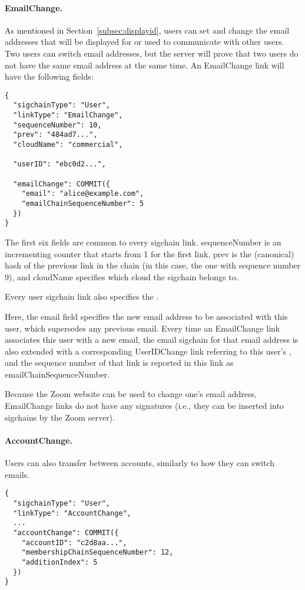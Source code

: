 \paragraph{EmailChange.} As mentioned in Section~\ref{subsec:displayid}, users can set and change the
email addresses that will be displayed for or used to communicate with other users. Two users can switch email addresses,
but the server will prove that two users do not have the same email address at the same time. An
\textsf{EmailChange} link will have the following fields:


\begin{Verbatim}
{
  "sigchainType": "User",
  "linkType": "EmailChange",
  "sequenceNumber": 10,
  "prev": "484ad7...",
  "cloudName": "commercial",

  "userID": "ebc0d2...",

  "emailChange": COMMIT({
    "email": "alice@example.com",
    "emailChainSequenceNumber": 5
  })
}
\end{Verbatim}

The first six fields are common to every sigchain link. \textsf{sequenceNumber} is an incrementing
counter that starts from 1 for the first link, \textsf{prev} is the (canonical) hash of the previous
link in the chain (in this case, the one with sequence number 9), and \textsf{cloudName} specifies
which cloud the sigchain belongs to.

Every user sigchain link also specifies the \userID.

Here, the \textsf{email} field specifies the new email address to be associated with this user,
which supersedes any previous email. Every time an \textsf{EmailChange} link associates this user
with a new email, the email sigchain for that email address is also extended with a corresponding
\textsf{UserIDChange} link referring to this user's \userID, and the sequence number of that link is
reported in this link as \textsf{emailChainSequenceNumber}.

Because the Zoom website can be used to change one's email address, \textsf{EmailChange} links do
not have any signatures (i.e., they can be inserted into sigchains by the Zoom server).

\paragraph{AccountChange.} Users can also transfer between accounts, similarly to how they can
switch emails.

\begin{Verbatim}
{
  "sigchainType": "User",
  "linkType": "AccountChange",
  ...
  "accountChange": COMMIT({
    "accountID": "c2d8aa...",
    "membershipChainSequenceNumber": 12,
    "additionIndex": 5
  })
}
\end{Verbatim}

